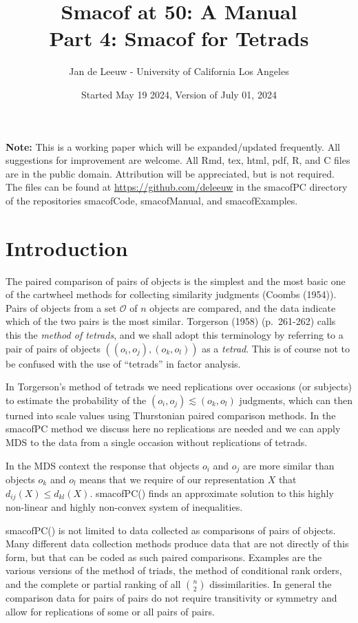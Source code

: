 \documentclass[
  12pt,
]{article}
\title{Smacof at 50: A Manual\\
Part 4: Smacof for Tetrads}
\author{Jan de Leeuw - University of California Los Angeles}
\date{Started May 19 2024, Version of July 01, 2024}
\newcommand{\sectionbreak}{\clearpage}
\begin{document}
\maketitle

{
\setcounter{tocdepth}{3}
\tableofcontents
}
\textbf{Note:} This is a working paper which will be expanded/updated
frequently. All suggestions for improvement are welcome. All Rmd, tex,
html, pdf, R, and C files are in the public domain. Attribution will be
appreciated, but is not required. The files can be found at
\url{https://github.com/deleeuw} in the smacofPC directory of the
repositories smacofCode, smacofManual, and smacofExamples.

\sectionbreak

\section{Introduction}\label{introduction}

The paired comparison of pairs of objects is the simplest and
the most basic one of the cartwheel methods for collecting
similarity judgments (Coombs (1954)).
Pairs of objects from a set
\(\mathcal{O}\) of \(n\) objects are compared, and the data indicate which of the two
pairs is the most similar. Torgerson (1958) (p.~261-262) calls this the \emph{method of tetrads}, and we shall adopt this terminology by referring to a pair of pairs of objects \(((o_i,o_j),(o_k,o_l))\) as a \emph{tetrad}. This is of course not to be confused with the use of ``tetrads'' in factor analysis.

In Torgerson's method of tetrads we need replications over occasions (or subjects) to estimate the probability of the \((o_i,o_j)\lesssim (o_k,o_l)\) judgments, which can then turned into scale values using Thurstonian paired comparison methods. In the smacofPC method we discuss here no replications are needed and we can apply MDS to the data from a single occasion without replications of tetrads.

In the MDS context the response
that objects \(o_i\) and \(o_j\) are more similar than objects
\(o_k\) and \(o_l\) means that we require
of our representation \(X\) that \(d_{ij}(X)\leq d_{kl}(X)\). smacofPC()
finds an approximate solution to this highly non-linear and
highly non-convex system of inequalities.

smacofPC() is not limited to data collected as comparisons of
pairs of objects. Many different data collection methods produce data that are not directly of this form, but that can be
coded as such paired comparisons. Examples are the various versions of the
method of triads, the method of conditional rank orders, and the
complete or partial ranking of all \(\binom{n}{2}\) dissimilarities.
In general the comparison data for pairs of pairs do not require transitivity or symmetry and allow for replications of some or all pairs of pairs.
\end{document}
